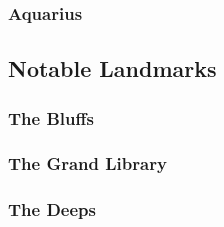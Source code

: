		\subsubsection{Aquarius}
	
	\subsection{Notable Landmarks}

		\subsubsection{The Bluffs}
		
		\subsubsection{The Grand Library}

		\subsubsection{The Deeps}
